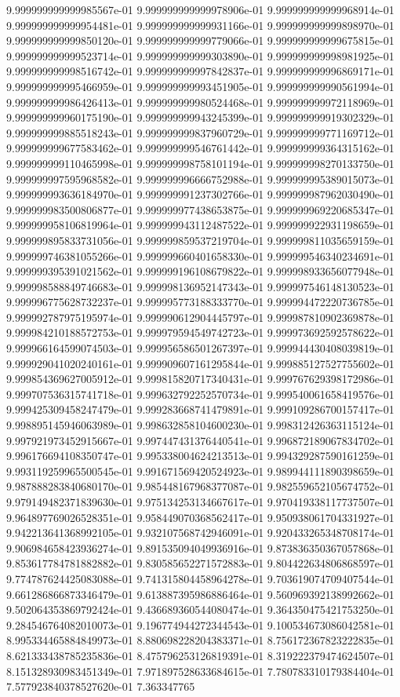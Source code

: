 9.999999999999985567e-01	9.999999999999978906e-01	9.999999999999968914e-01	9.999999999999954481e-01	9.999999999999931166e-01	9.999999999999898970e-01	9.999999999999850120e-01	9.999999999999779066e-01	9.999999999999675815e-01	9.999999999999523714e-01	9.999999999999303890e-01	9.999999999998981925e-01	9.999999999998516742e-01	9.999999999997842837e-01	9.999999999996869171e-01	9.999999999995466959e-01	9.999999999993451905e-01	9.999999999990561994e-01	9.999999999986426413e-01	9.999999999980524468e-01	9.999999999972118969e-01	9.999999999960175190e-01	9.999999999943245399e-01	9.999999999919302329e-01	9.999999999885518243e-01	9.999999999837960729e-01	9.999999999771169712e-01	9.999999999677583462e-01	9.999999999546761442e-01	9.999999999364315162e-01	9.999999999110465998e-01	9.999999998758101194e-01	9.999999998270133750e-01	9.999999997595968582e-01	9.999999996666752988e-01	9.999999995389015073e-01	9.999999993636184970e-01	9.999999991237302766e-01	9.999999987962030490e-01	9.999999983500806877e-01	9.999999977438653875e-01	9.999999969220685347e-01	9.999999958106819964e-01	9.999999943112487522e-01	9.999999922931198659e-01	9.999999895833731056e-01	9.999999859537219704e-01	9.999999811035659159e-01	9.999999746381055266e-01	9.999999660401658330e-01	9.999999546340234691e-01	9.999999395391021562e-01	9.999999196108679822e-01	9.999998933656077948e-01	9.999998588849746683e-01	9.999998136952147343e-01	9.999997546148130523e-01	9.999996775628732237e-01	9.999995773188333770e-01	9.999994472220736785e-01	9.999992787975195974e-01	9.999990612904445797e-01	9.999987810902369878e-01	9.999984210188572753e-01	9.999979594549742723e-01	9.999973692592578622e-01	9.999966164599074503e-01	9.999956586501267397e-01	9.999944430408039819e-01	9.999929041020240161e-01	9.999909607161295844e-01	9.999885127527755602e-01	9.999854369627005912e-01	9.999815820717340431e-01	9.999767629398172986e-01	9.999707536315741718e-01	9.999632792252570734e-01	9.999540061658419576e-01	9.999425309458247479e-01	9.999283668741479891e-01	9.999109286700157417e-01	9.998895145946063989e-01	9.998632858104600230e-01	9.998312426363115124e-01	9.997921973452915667e-01	9.997447431376440541e-01	9.996872189067834702e-01	9.996176694108350747e-01	9.995338004624213513e-01	9.994329287590161259e-01	9.993119259965500545e-01	9.991671569420524923e-01	9.989944111890398659e-01	9.987888283840680170e-01	9.985448167968377087e-01	9.982559652105674752e-01	9.979149482371839630e-01	9.975134253134667617e-01	9.970419338117737507e-01	9.964897769026528351e-01	9.958449070368562417e-01	9.950938061704331927e-01	9.942213641368992105e-01	9.932107568742946091e-01	9.920433265348708174e-01	9.906984658423936274e-01	9.891535094049936916e-01	9.873836350367057868e-01	9.853617784781882882e-01	9.830585652271572883e-01	9.804422634806868597e-01	9.774787624425083088e-01	9.741315804458964278e-01	9.703619074709407544e-01	9.661286866873346479e-01	9.613887395986886464e-01	9.560969392138992662e-01	9.502064353869792424e-01	9.436689360544080474e-01	9.364350475421753250e-01	9.284546764082010073e-01	9.196774944272344543e-01	9.100534673086042581e-01	8.995334465884849973e-01	8.880698228204383371e-01	8.756172367823222835e-01	8.621333438785235836e-01	8.475796253126819391e-01	8.319222379474624507e-01	8.151328930983451349e-01	7.971897528633684615e-01	7.780783310179384404e-01	7.577923840378527620e-01	7.363347765